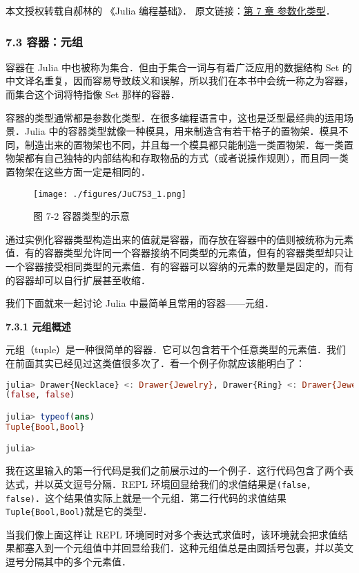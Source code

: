 
本文授权转载自郝林的 《Julia 编程基础》． 原文链接：\href{https://github.com/hyper0x/JuliaBasics/blob/master/book/ch07.md}{第 7 章 参数化类型}．


\subsubsection{7.3 容器：元组}

容器在 Julia 中也被称为集合．但由于集合一词与有着广泛应用的数据结构 Set 的中文译名重复，因而容易导致歧义和误解，所以我们在本书中会统一称之为容器，而集合这个词将特指像 Set 那样的容器．

容器的类型通常都是参数化类型．在很多编程语言中，这也是泛型最经典的运用场景．Julia 中的容器类型就像一种模具，用来制造含有若干格子的置物架．模具不同，制造出来的置物架也不同，并且每一个模具都只能制造一类置物架．每一类置物架都有自己独特的内部结构和存取物品的方式（或者说操作规则），而且同一类置物架在这些方面一定是相同的．
\begin{figure}[ht]
\centering
\texttt{[image: ./figures/JuC7S3\_1.png]}
\caption{图 7-2 容器类型的示意} \label{JuC7S3_fig1}
\end{figure}

通过实例化容器类型构造出来的值就是容器，而存放在容器中的值则被统称为元素值．有的容器类型允许同一个容器接纳不同类型的元素值，但有的容器类型却只让一个容器接受相同类型的元素值．有的容器可以容纳的元素的数量是固定的，而有的容器却可以自行扩展甚至收缩．

我们下面就来一起讨论 Julia 中最简单且常用的容器——元组．

\textbf{7.3.1 元组概述 }

元组（tuple）是一种很简单的容器．它可以包含若干个任意类型的元素值．我们在前面其实已经见过这类值很多次了．看一个例子你就应该能明白了：
\begin{lstlisting}[language=julia]
julia> Drawer{Necklace} <: Drawer{Jewelry}, Drawer{Ring} <: Drawer{Jewelry}
(false, false)

julia> typeof(ans)
Tuple{Bool,Bool}

julia> 
\end{lstlisting}

我在这里输入的第一行代码是我们之前展示过的一个例子．这行代码包含了两个表达式，并以英文逗号分隔．REPL 环境回显给我们的求值结果是\verb|(false, false)|．这个结果值实际上就是一个元组．第二行代码的求值结果\verb|Tuple{Bool,Bool}|就是它的类型．

当我们像上面这样让 REPL 环境同时对多个表达式求值时，该环境就会把求值结果都塞入到一个元组值中并回显给我们．这种元组值总是由圆括号包裹，并以英文逗号分隔其中的多个元素值．

